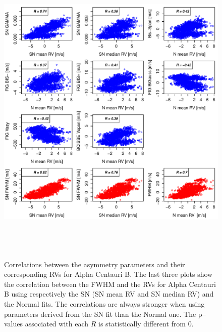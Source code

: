 \documentclass{aa}
\begin{document}
\begin{figure}[htbp]
\begin{center}
\includegraphics[height = 6in]{HD12862_[4]Comparison_para.pdf}  
   \caption{Correlations between the asymmetry parameters and their corresponding RVs for Alpha Centauri B. The last three plots show the correlation between the FWHM and the RVs for Alpha Centauri B using respectively the SN (SN mean RV and SN median RV) and the Normal fits. The correlations are always stronger when using parameters derived from the SN fit than the Normal one. The p--values associated with each $R$ is statistically different from $0$.} 
   \label{fig:alphacent:corrPlot}
\end{center}
\end{figure}
%
\end{document}
